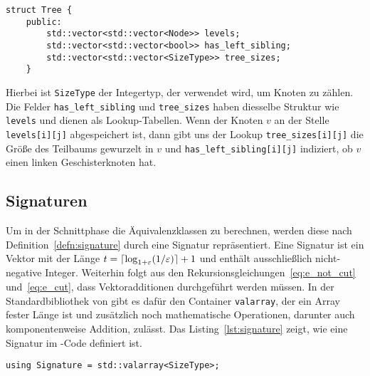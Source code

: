 \begin{lstlisting}[caption={Definition von \texttt{struct Tree}}, label={lst:structtree}]
struct Tree {
    public:
        std::vector<std::vector<Node>> levels;
        std::vector<std::vector<bool>> has_left_sibling;
        std::vector<std::vector<SizeType>> tree_sizes;
    }
\end{lstlisting}
Hierbei ist \texttt{SizeType} der Integertyp, der verwendet wird, um Knoten zu zählen.
Die Felder \texttt{has\_left\_sibling} und \texttt{tree\_sizes} haben diesselbe Struktur wie \texttt{levels} und dienen als Lookup-Tabellen.
Wenn der Knoten $v$ an der Stelle \texttt{levels[i][j]} abgespeichert ist, dann gibt uns der Lookup \texttt{tree\_sizes[i][j]} die Größe des Teilbaums gewurzelt in $v$ und \texttt{has\_left\_sibling[i][j]} indiziert, ob $v$ einen linken Geschisterknoten hat.

\subsection{Signaturen}\label{sec:sigimpl}
Um in der Schnittphase die Äquivalenzklassen zu berechnen, werden diese nach Definition~\ref{defn:signature} durch eine Signatur repräsentiert.
Eine Signatur ist ein Vektor mit der Länge $t = \lceil\log_{1+\varepsilon}(1/\varepsilon)\rceil + 1$ und enthält ausschließlich nicht-negative Integer.
Weiterhin folgt aus den Rekursionsgleichungen~\eqref{eq:e_not_cut} und~\eqref{eq:e_cut}, dass Vektoradditionen durchgeführt werden müssen.
In der Standardbibliothek von \Cpp{} gibt es dafür den Container \texttt{valarray}, der ein Array fester Länge ist und zusätzlich noch mathematische Operationen, darunter auch komponentenweise Addition, zulässt. 
Das Listing~\ref{lst:signature} zeigt, wie eine Signatur im \Cpp\hyp Code definiert ist.
\begin{lstlisting}[caption={Definition von \texttt{Signature}}, label={lst:signature}]
using Signature = std::valarray<SizeType>;
\end{lstlisting}

